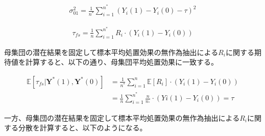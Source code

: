 \documentclass[a4paper]{bxjsarticle}
\begin{document}
\begin{equation}
\begin{split}
\sigma^2_{01} = \frac{1}{n^{\ast}} \sum_{i=1}^{n^{\ast}} (Y_i(1) - Y_i(0) - \tau)^2
\end{split}
\end{equation} 


\begin{equation}
\begin{split}
\tau_{fs} = \frac{1}{n} \sum_{i=1}^{n^{\ast}} R_i \cdot (Y_i(1) - Y_i(0))
\end{split}
\end{equation} 

母集団の潜在結果を固定して標本平均処置効果の無作為抽出による$R_i$に関する期待値を計算すると、以下の通り、母集団平均処置効果に一致する。

\begin{equation}
\begin{split}
\mathbb{E} \left[\tau_{fs} | \mathbf{Y}^\ast(1),\mathbf{Y}^\ast(0) \right] &= \frac{1}{n^\ast} \sum_{i=1}^n \mathbb{E} [R_i] \cdot (Y_i(1) - Y_i(0)) \\\
&=\frac{1}{n} \sum_{i=1}^{n^\ast} \frac{n}{n_{^\ast}} \cdot (Yi(1) - Y_i(0)) = \tau
\end{split}
\end{equation} 

一方、母集団の潜在結果を固定して標本平均処置効果の無作為抽出による$R_i$に関する分散を計算すると、以下のようになる。
\end{document}
